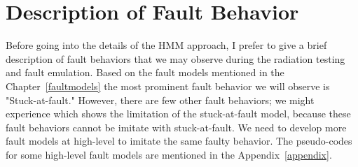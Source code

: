 \section{Description of Fault Behavior}
Before going into the details of the HMM approach, I prefer to give a brief description of fault behaviors that we may observe during the radiation testing and fault emulation. Based on the fault models mentioned in the Chapter~\ref{faultmodels} the most prominent fault behavior we will observe is "Stuck-at-fault." However, there are few other fault behaviors; we might experience which shows the limitation of the stuck-at-fault model, because these fault behaviors cannot be imitate with stuck-at-fault. We need to develop more fault models at high-level to imitate the same faulty behavior. The pseudo-codes for some high-level fault models are mentioned in the Appendix~\ref{appendix}.
